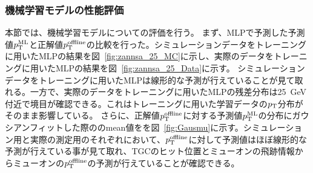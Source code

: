 


\subsubsection{機械学習モデルの性能評価}
本節では、機械学習モデルについての評価を行う。
まず、MLPで予測した予測値$p_{\rm{T}}^{\rm{ML}}$と正解値$p_{\rm{T}}^{\rm{offline}}$の比較を行った。シミュレーションデータをトレーニングに用いたMLPの結果を図~\ref{fig:zannsa_25_MC}に示し、実際のデータをトレーニングに用いたMLPの結果を図~\ref{fig:zannsa_25_Data}に示す。
シミュレーションデータをトレーニングに用いたMLPは線形的な予測が行えていることが見て取れる。一方で、実際のデータをトレーニングに用いたMLPの残差分布は25~GeV付近で境目が確認できる。これはトレーニングに用いた学習データの$p_{\rm{T}}$分布がそのまま影響している。
さらに、正解値$p_{\rm{T}}^{\rm{offline}}$に対する予測値$p_{\rm{T}}^{\rm{ML}}$の分布にガウシアンフィットした際ののmean値をを図~\ref{fig:Gausmu}に示す。シミュレーション用と実際の測定用のそれぞれにおいて、$p_{\rm{T}}^{\rm{offline}}$に対して予測値はほぼ線形的な予測が行えている事が見て取れ、TGCのヒット位置とミューオンの飛跡情報からミューオンの$p_{\rm{T}}^{\rm{offline}}$の予測が行えていることが確認できる。
